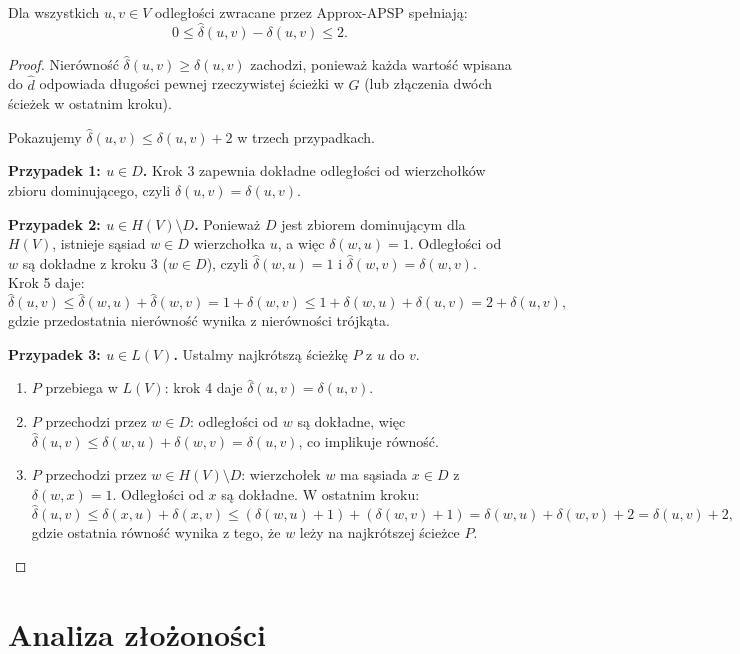 \begin{twierdzenie}
Dla wszystkich $u, v \in V$ odległości zwracane przez Approx-APSP spełniają:
\[
0 \leq \hat{\delta}(u, v) - \delta(u, v) \leq 2.
\]
\end{twierdzenie}

\begin{proof}
Nierówność $\hat{\delta}(u, v) \geq \delta(u, v)$ zachodzi, ponieważ każda wartość wpisana do $\hat{d}$ odpowiada długości pewnej rzeczywistej ścieżki w $G$ (lub złączenia dwóch ścieżek w ostatnim kroku).

Pokazujemy $\hat{\delta}(u, v) \leq \delta(u, v) + 2$ w trzech przypadkach.

\textbf{Przypadek 1: $u \in D$.} Krok 3 zapewnia dokładne odległości od wierzchołków zbioru dominującego, czyli $\hat{\delta}(u, v) = \delta(u, v)$.

\textbf{Przypadek 2: $u \in H(V) \setminus D$.} Ponieważ $D$ jest zbiorem
dominującym dla $H(V)$, istnieje sąsiad $w \in D$ wierzchołka $u$,
a więc $\delta(w, u) = 1$. Odległości od $w$ są dokładne z kroku 3
($w \in D$), czyli $\hat{\delta}(w, u) = 1$ i $\hat{\delta}(w, v) = \delta(w, v)$.
Krok 5 daje:
\[
\hat{\delta}(u, v) \leq \hat{\delta}(w, u) + \hat{\delta}(w, v)
= 1 + \delta(w, v)
\leq 1 + \delta(w, u) + \delta(u, v)
= 2 + \delta(u, v),
\]
gdzie przedostatnia nierówność wynika z nierówności trójkąta.

\textbf{Przypadek 3: $u \in L(V)$.} Ustalmy najkrótszą ścieżkę $P$ z $u$ do $v$.
\begin{enumerate}
  \item[(a)] $P$ przebiega w $L(V)$: krok 4 daje $\hat{\delta}(u, v) = \delta(u, v)$.
  \item[(b)] $P$ przechodzi przez $w \in D$: odległości od $w$ są dokładne, więc $\hat{\delta}(u, v) \leq \delta(w, u) + \delta(w, v) = \delta(u, v)$, co implikuje równość.
  \item[(c)] $P$ przechodzi przez $w \in H(V) \setminus D$: wierzchołek $w$ ma sąsiada $x \in D$ z $\delta(w, x) = 1$. Odległości od $x$ są dokładne. W ostatnim kroku:
  \[
  \hat{\delta}(u, v) \leq \delta(x, u) + \delta(x, v) \leq (\delta(w, u) + 1) + (\delta(w, v) + 1) = \delta(w, u) + \delta(w, v) + 2 = \delta(u, v) + 2,
  \]
  gdzie ostatnia równość wynika z tego, że $w$ leży na najkrótszej ścieżce $P$.
\end{enumerate}
\end{proof}

\section{Analiza złożoności}

